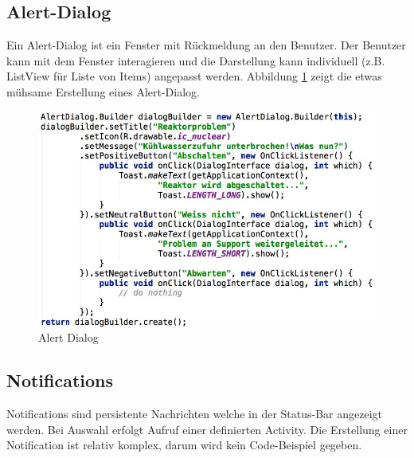 \subsection{Alert-Dialog}

Ein Alert-Dialog ist ein Fenster mit Rückmeldung an den Benutzer. Der Benutzer kann mit dem Fenster interagieren und die Darstellung kann individuell (z.B. ListView für Liste von Items) angepasst werden. Abbildung \ref{fig:alert-dialog} zeigt die etwas mühsame Erstellung eines Alert-Dialog.

\begin{figure}
\centering
\includegraphics[width=0.7\linewidth]{fig/alert-dialog}
\caption{Alert Dialog}
\label{fig:alert-dialog}
\end{figure}

\subsection{Notifications}

Notifications sind persistente Nachrichten welche in der Status-Bar angezeigt werden. Bei Auswahl erfolgt Aufruf einer definierten Activity. Die Erstellung einer Notification ist relativ komplex, darum wird kein Code-Beispiel gegeben.
